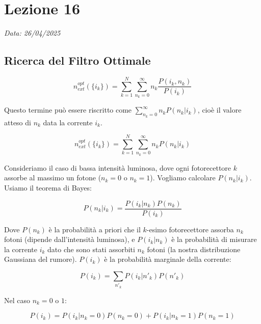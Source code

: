 \chapter{Lezione 16}
\label{capitolo_16}
\textit{Data: 26/04/2025}

\section{Ricerca del Filtro Ottimale}

\begin{equation} \label{eq:ch16_1}
n_{ext}^{opt}(\{i_k\}) = \sum_{k=1}^{N} \sum_{n_k=0}^{\infty} n_k \frac{ P(i_k, n_k)}{P(i_k)}
\end{equation}

Questo termine può essere riscritto come $\sum_{n_k=0}^\infty n_k P(n_k | i_k)$, cioè il valore atteso di $n_k$ data la corrente $i_k$.

\begin{equation} \label{eq:ch16_2}
n_{ext}^{opt}(\{i_k\}) = \sum_{k=1}^{N} \sum_{n_k=0}^{\infty} n_k P(n_k | i_k)
\end{equation}

Consideriamo il caso di bassa intensità luminosa, dove ogni fotorecettore $k$ assorbe al massimo un fotone ($n_k=0$ o $n_k=1$). Vogliamo calcolare $P(n_k|i_k)$.
Usiamo il teorema di Bayes:

\begin{equation} \label{eq:ch16_3}
P(n_k | i_k) = \frac{P(i_k | n_k) P(n_k)}{P(i_k)}
\end{equation}

Dove $P(n_k)$ è la probabilità a priori che il $k$-esimo fotorecettore assorba $n_k$ fotoni (dipende dall'intensità luminosa), e $P(i_k | n_k)$ è la probabilità di misurare la corrente $i_k$ dato che sono stati assorbiti $n_k$ fotoni (la nostra distribuzione Gaussiana del rumore). $P(i_k)$ è la probabilità marginale della corrente:

\begin{equation} \label{eq:ch16_4}
P(i_k) = \sum_{n'_k} P(i_k | n'_k) P(n'_k)
\end{equation}

Nel caso $n_k=0$ o $1$:

\begin{equation} \label{eq:ch16_5}
P(i_k) = P(i_k | n_k=0) P(n_k=0) + P(i_k | n_k=1) P(n_k=1)
\end{equation}

